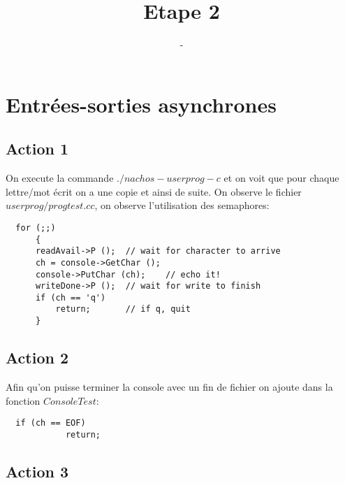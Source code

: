 \documentclass[a4paper,10pt]{article}
\title{Etape 2}
\author{-}
\begin{document}
\maketitle

\section{Entrées-sorties asynchrones}

\subsection{Action 1}

  On execute la commande $./nachos-userprog -c$ et on voit que pour chaque lettre/mot écrit on a une copie et ainsi de suite. On observe le fichier
$userprog/ progtest.cc$, on observe l'utilisation des semaphores:

\begin{lstlisting}
  for (;;)
      {
	  readAvail->P ();	// wait for character to arrive
	  ch = console->GetChar ();
	  console->PutChar (ch);	// echo it!
	  writeDone->P ();	// wait for write to finish
	  if (ch == 'q')
	      return;		// if q, quit
      }
\end{lstlisting}


\subsection{Action 2}

  Afin qu'on puisse terminer la console avec un fin de fichier on ajoute dans la fonction $ConsoleTest$:

\begin{lstlisting}
  if (ch == EOF)
            return;
\end{lstlisting}

\subsection{Action 3}
\end{document}
